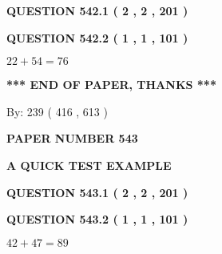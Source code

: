 \documentclass[12pt]{article}
\begin{document}
   
  
\vspace{0.2in}
  
{\textbf{\Large{QUESTION
542.1 
 ( 2 , 2 , 201 )
}}}
  
  
  
\vspace{0.2in}
  
{\textbf{\Large{QUESTION
542.2 
 ( 1 , 1 , 101 )
}}}
  
  
 
 

$ %
22 +  %
54=   %
76$
 
 
   
   
 \vspace{0.2in}
 
   
   
   
   
\vspace{1.0in} 
{\textbf{\large{ *** END OF PAPER, THANKS *** }}} 
   
   
\hspace{1.0in} By: 
 239 ( 416 ,  613 )
   
   
   
   
\newpage 
\setcounter{page}{ 
   543001 } 
   
   
   
   
 {\textbf{ \Large{ PAPER NUMBER  543  }}}
   
   
\vspace{0.2in}
   
   
   
   
   
   
 \vspace{0.2in}
{\LARGE {\textbf{ A QUICK TEST EXAMPLE}}}
   
   
  
\vspace{0.2in}
  
{\textbf{\Large{QUESTION
543.1 
 ( 2 , 2 , 201 )
}}}
  
  
  
\vspace{0.2in}
  
{\textbf{\Large{QUESTION
543.2 
 ( 1 , 1 , 101 )
}}}
  
  
 
 

$ %
42 +  %
47=   %
89$
 
 
   
\end{document}
